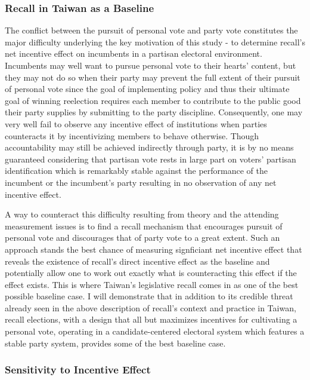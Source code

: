 \documentclass[hyphens, crop=false]{standalone}
\begin{document}
		\subsubsection*{Recall in Taiwan as a Baseline}
		The conflict between the pursuit of personal vote and party vote
		constitutes the major difficulty underlying the key motivation of this study
		- to determine recall's net incentive effect on incumbents in a partisan electoral environment.
		Incumbents may well want to pursue personal vote to their hearts' content,
		but they may not do so when their party
		may prevent the full extent of their pursuit of personal vote since
		the goal of implementing policy and thus their ultimate goal of winning reelection
		requires each member to contribute to the public good their party supplies
		by submitting to the party discipline.
		Consequently, one may very well fail to observe any incentive effect of institutions
		when parties counteracts it by incentivizing members to behave otherwise.
		Though accountability may still be achieved indirectly through party,
		it is by no means guaranteed considering that
		partisan vote rests in large part on voters' partisan identification
		which is remarkably stable against the performance of the incumbent or the incumbent's party
		resulting in no observation of any net incentive effect.
		
		A way to counteract this difficulty resulting from theory and
		the attending measurement issues is to
		find a recall mechanism that encourages pursuit of personal vote and discourages that of party vote to a great extent.
		Such an approach stands the best chance
		of measuring signficiant net incentive effect that
		reveals the existence of recall's direct incentive effect as the baseline
		and potentially allow one to work out exactly what is counteracting this effect if the effect exists.
		This is where Taiwan's legislative recall comes in as one of the best possible baseline case.
		I will demonstrate that
		in addition to its credible threat already seen in the above description of recall's context and practice in Taiwan,
		recall elections,
		with a
		design that all but maximizes incentives for cultivating a personal vote,
		operating in a candidate-centered electoral system which
		features a stable party system,
		provides some of the best baseline case.
		
		\subsubsection*{Sensitivity to Incentive Effect}
		
\end{document}
